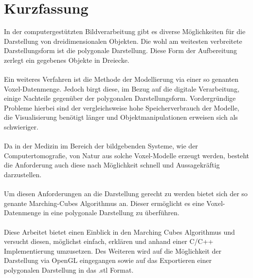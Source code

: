 
\chapter{Kurzfassung}

In der computergestützten Bildverarbeitung gibt es diverse Möglichkeiten für die Darstellung von dreidimensionalen Objekten. Die wohl am weitesten verbreitete Darstellungsform ist die polygonale Darstellung. Diese Form der Aufbereitung zerlegt ein gegebenes Objekte in Dreiecke. 
\\\\
Ein weiteres Verfahren ist die Methode der Modellierung via einer so genanten Voxel-Datenmenge. Jedoch birgt diese, im Bezug auf die digitale Verarbeitung, einige Nachteile gegenüber der polygonalen Darstellungsform. Vordergründige Probleme hierbei sind der vergleichsweise hohe Speicherverbrauch der Modelle, die Visualisierung benötigt länger und Objektmanipulationen erweisen sich als schwieriger.
\\\\
Da in der Medizin im Bereich der bildgebenden Systeme, wie der Computertomografie, von Natur aus solche Voxel-Modelle erzeugt werden, besteht die Anforderung auch diese nach Möglichkeit schnell und Aussagekräftig darzustellen.
\\\\
Um diesen Anforderungen an die Darstellung gerecht zu werden bietet sich der so genante Marching-Cubes Algorithmus an. Dieser ermöglicht es eine Voxel-Datenmenge in eine polygonale Darstellung zu überführen. 
\\\\
Diese Arbeitet bietet einen Einblick in den Marching Cubes Algorithmus und versucht diesen, möglichst einfach, erklären und anhand einer C/C++ Implementierung umzusetzen. Des Weiteren wird auf die Möglichkeit der Darstellung via OpenGL eingegangen sowie auf das Exportieren einer polygonalen Darstellung in das .stl Format.
